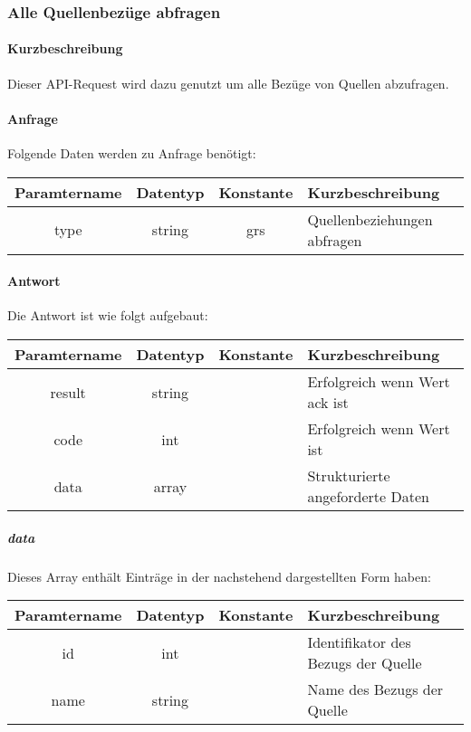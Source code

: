 \subsubsection{Alle Quellenbezüge abfragen}
\paragraph{Kurzbeschreibung}Dieser API-Request wird dazu genutzt um alle Bezüge von Quellen abzufragen.
\paragraph{Anfrage}Folgende Daten werden zu Anfrage benötigt:
\begin{table}[H]
	\begin{tabular}{|c|c|c|p{6.5cm}|}
		\hline
		\textbf{Paramtername} & \textbf{Datentyp} & \textbf{Konstante} & \textbf{Kurzbeschreibung}                                                                                               \\ \hline
		type                & string            & grs                & Quellenbeziehungen abfragen \\ \hline
	\end{tabular}
\end{table}
\paragraph{Antwort}Die Antwort ist wie folgt aufgebaut:
\begin{table}[H]
	\begin{tabular}{|c|c|c|p{6.5cm}|}
		\hline
		\textbf{Paramtername} & \textbf{Datentyp} & \textbf{Konstante} & \textbf{Kurzbeschreibung}                                                                                               \\ \hline
		result              & string           &                 & Erfolgreich wenn Wert {\glqq ack\grqq} ist \\ \hline
		code                & int              &                 & Erfolgreich wenn Wert {\glqq 0\grqq} ist \\ \hline
		data                & array            &                 & Strukturierte angeforderte Daten \\ \hline
	\end{tabular}
\end{table}
\subparagraph{data}Dieses Array enthält Einträge in der nachstehend dargestellten Form haben:
\begin{table}[H]
	\begin{tabular}{|c|c|c|p{6.5cm}|}
		\hline
		\textbf{Paramtername} & \textbf{Datentyp} & \textbf{Konstante} & \textbf{Kurzbeschreibung}    \\ \hline
		id         & int               &                 & Identifikator des Bezugs der Quelle \\ \hline
		name       & string            &                 & Name des Bezugs der Quelle \\ \hline
	\end{tabular}
\end{table}
